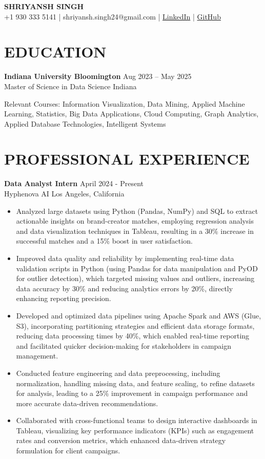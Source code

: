 \documentclass[12pt,a4paper]{article}
\newcommand{\cvitem}[4]{
  \textbf{#1} \hfill #2\\
  #3 \hfill #4 \par\vspace{-0.5em} %
}
\newcommand{\workexp}[4]{
  \textbf{#1} \hfill #2\\
  #3 \hfill #4\\
  \vspace{-1em} %
}
\begin{document}
\begin{center}
\textbf{\LARGE SHRIYANSH SINGH}\\
\normalsize
+1 930 333 5141 | shriyansh.singh24@gmail.com | \href{https://www.linkedin.com/in/shriyansh-bir-singh}{LinkedIn} | \href{https://github.com/shriyansh24}{GitHub}
\end{center}

\section*{EDUCATION}
\cvitem{Indiana University Bloomington}{Aug 2023 – May 2025}{Master of Science in Data Science}{Indiana}
\textnormal{Relevant Courses:} Information Visualization, Data Mining, Applied Machine Learning, Statistics, Big Data Applications, Cloud Computing, Graph Analytics, Applied Database Technologies, Intelligent Systems

\section*{PROFESSIONAL EXPERIENCE}

\workexp{Data Analyst Intern}{April 2024 - Present}{Hyphenova AI}{Los Angeles, California}
\begin{itemize}[leftmargin=*,noitemsep,topsep=0pt]
\item Analyzed large datasets using Python (Pandas, NumPy) and SQL to extract actionable insights on brand-creator matches, employing regression analysis and data visualization techniques in Tableau, resulting in a 30\% increase in successful matches and a 15\% boost in user satisfaction.
\item Improved data quality and reliability by implementing real-time data validation scripts in Python (using Pandas for data manipulation and PyOD for outlier detection), which targeted missing values and outliers, increasing data accuracy by 30\% and reducing analytics errors by 20\%, directly enhancing reporting precision.
\item Developed and optimized data pipelines using Apache Spark and AWS (Glue, S3), incorporating partitioning strategies and efficient data storage formats, reducing data processing times by 40\%, which enabled real-time reporting and facilitated quicker decision-making for stakeholders in campaign management.
\item Conducted feature engineering and data preprocessing, including normalization, handling missing data, and feature scaling, to refine datasets for analysis, leading to a 25\% improvement in campaign performance and more accurate data-driven recommendations.
\item Collaborated with cross-functional teams to design interactive dashboards in Tableau, visualizing key performance indicators (KPIs) such as engagement rates and conversion metrics, which enhanced data-driven strategy formulation for client campaigns.
\end{itemize}
\end{document}
